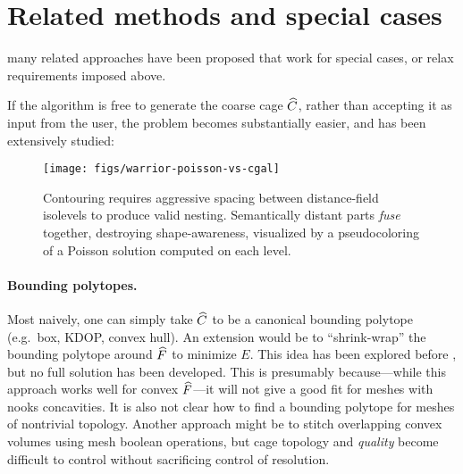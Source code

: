 \section{Related methods and special cases}

many related approaches have been proposed that work for special cases, or
relax requirements imposed above.

If the algorithm is free to generate the coarse cage $\widehat{C}$, rather than
accepting it as input from the user, the problem becomes substantially easier,
and has been extensively studied:
%
\begin{figure}[b]
\texttt{[image: figs/warrior-poisson-vs-cgal]}
\caption{Contouring requires aggressive spacing between distance-field
isolevels to produce valid nesting. Semantically distant parts \emph{fuse}
together, destroying shape-awareness, visualized by a pseudocoloring of a
Poisson solution computed on each level.} \label{fig:warrior-poisson}
\end{figure}

\paragraph{Bounding polytopes.}
%
Most naively, one can simply take $\widehat{C}$ to be a canonical bounding polytope
(e.g.\ box, KDOP, convex hull). An extension would be to ``shrink-wrap'' the
bounding polytope around $\widehat{F}$ to minimize $E$. This idea has been explored
before \cite{Peterhans:2012,Wang:2013:HPE}, but no full solution has been
developed.
%
This is presumably because---while this approach works well for convex
$\widehat{F}$---it will not give a good fit for meshes with nooks concavities. It is
also not clear how to find a bounding polytope for meshes of nontrivial
topology.
%
Another approach might be to stitch overlapping convex volumes
\cite{Xian:2012tv} using mesh boolean operations, but cage topology and
\emph{quality} become difficult to control without sacrificing control of
resolution.

